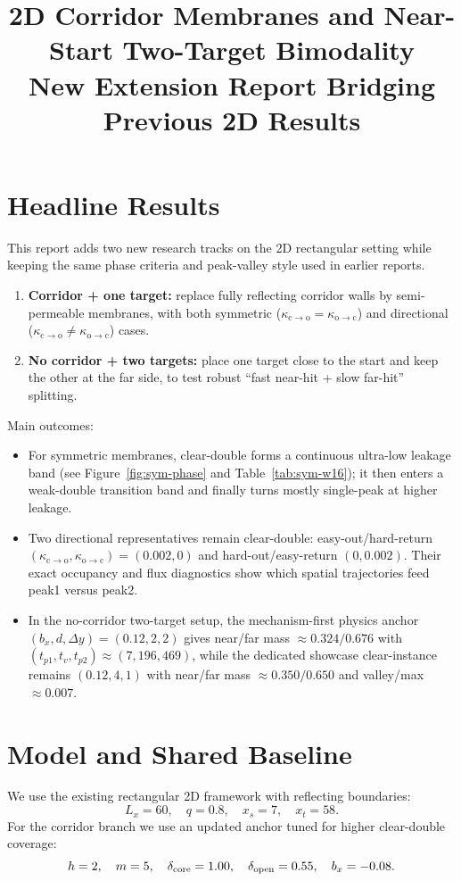 \documentclass[11pt]{article}
\title{2D Corridor Membranes and Near-Start Two-Target Bimodality\\\large New Extension Report Bridging Previous 2D Results}
\author{}
\date{}
\begin{document}
\maketitle

\section*{Headline Results}
This report adds two new research tracks on the 2D rectangular setting while keeping the same phase criteria and peak-valley style used in earlier reports.
\begin{enumerate}
  \item \textbf{Corridor + one target:} replace fully reflecting corridor walls by semi-permeable membranes, with both symmetric ($\kappa_{\mathrm{c\to o}}=\kappa_{\mathrm{o\to c}}$) and directional ($\kappa_{\mathrm{c\to o}}\neq\kappa_{\mathrm{o\to c}}$) cases.
  \item \textbf{No corridor + two targets:} place one target close to the start and keep the other at the far side, to test robust ``fast near-hit + slow far-hit'' splitting.
\end{enumerate}

Main outcomes:
\begin{itemize}
  \item For symmetric membranes, clear-double forms a continuous ultra-low leakage band (see Figure~\ref{fig:sym-phase} and Table~\ref{tab:sym-w16}); it then enters a weak-double transition band and finally turns mostly single-peak at higher leakage.
  \item Two directional representatives remain clear-double: easy-out/hard-return $(\kappa_{\mathrm{c\to o}},\kappa_{\mathrm{o\to c}})=(0.002,0)$ and hard-out/easy-return $(0,0.002)$. Their exact occupancy and flux diagnostics show which spatial trajectories feed peak1 versus peak2.
  \item In the no-corridor two-target setup, the mechanism-first physics anchor $(b_x,d,\Delta y)=(0.12,2,2)$ gives near/far mass $\approx0.324/0.676$ with $(t_{p1},t_v,t_{p2})\approx(7,196,469)$, while the dedicated showcase clear-instance remains $(0.12,4,1)$ with near/far mass $\approx0.350/0.650$ and valley/max $\approx0.007$.
\end{itemize}

\section{Model and Shared Baseline}
We use the existing rectangular 2D framework with reflecting boundaries:
\[
L_x=60,\quad q=0.8,\quad x_s=7,\quad x_t=58.
\]
For the corridor branch we use an updated anchor tuned for higher clear-double coverage:
\[
h=2,\quad m=5,\quad \delta_{\rm core}=1.00,\quad \delta_{\rm open}=0.55,\quad b_x=-0.08.
\]
\end{document}
